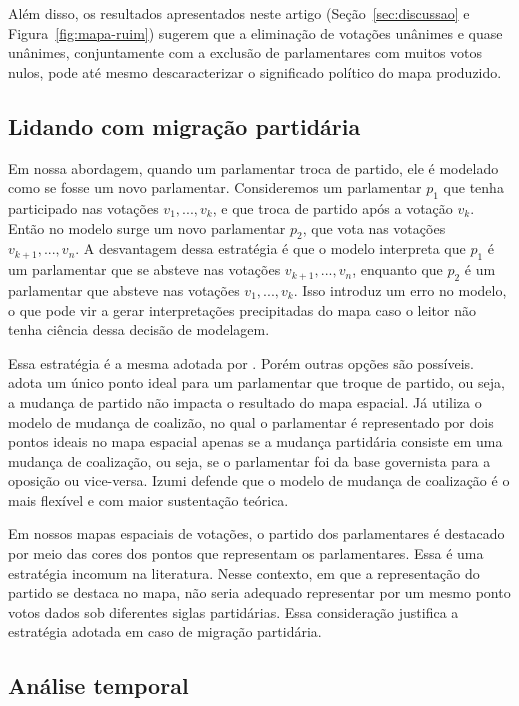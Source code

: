 \documentclass[
	article,			%
	12pt,				%
    twoside,			%
	a4paper,			%
	english,			%
	french,				%
	spanish,			%
	brazil,				%
	]{abntex2}
\begin{document}
Além disso, os resultados apresentados neste artigo (Seção~\ref{sec:discussao} e Figura~\ref{fig:mapa-ruim}) sugerem que a eliminação de votações unânimes e quase unânimes, conjuntamente com a exclusão de parlamentares com muitos votos nulos, pode até mesmo descaracterizar o significado político do mapa produzido.

\subsection{Lidando com migração partidária}

Em nossa abordagem, quando um parlamentar troca de partido, ele é modelado como se fosse um novo parlamentar. Consideremos um parlamentar $p_1$ que tenha participado nas votações $v_1, ..., v_k$, e que troca de partido após a votação $v_k$. Então no modelo surge um novo parlamentar $p_2$, que vota nas votações $v_{k+1}, ..., v_n$. A desvantagem dessa estratégia é que o modelo interpreta que $p_1$ é um parlamentar que se absteve nas votações $v_{k+1}, ..., v_n$, enquanto que $p_2$ é um parlamentar que absteve nas votações $v_1, ..., v_k$. Isso introduz um erro no modelo, o que pode vir a gerar interpretações precipitadas do mapa caso o leitor não tenha ciência dessa decisão de modelagem.

Essa estratégia é a mesma adotada por . Porém outras opções são possíveis.  adota um único ponto ideal para um parlamentar que troque de partido, ou seja, a mudança de partido não impacta o resultado do mapa espacial. Já  utiliza o modelo de mudança de coalizão, no qual o parlamentar é representado por dois pontos ideais no mapa espacial apenas se a mudança partidária consiste em uma mudança de coalização, ou seja, se o parlamentar foi da base governista para a oposição ou vice-versa. Izumi defende que o modelo de mudança de coalização é o mais flexível e com maior sustentação teórica. 

Em nossos mapas espaciais de votações, o partido dos parlamentares é destacado por meio das cores dos pontos que representam os parlamentares. Essa é uma estratégia incomum na literatura. Nesse contexto, em que a representação do partido se destaca no mapa, não seria adequado representar por um mesmo ponto votos dados sob diferentes siglas partidárias. Essa consideração justifica a estratégia adotada em caso de migração partidária.

\subsection{Análise temporal}
\end{document}
